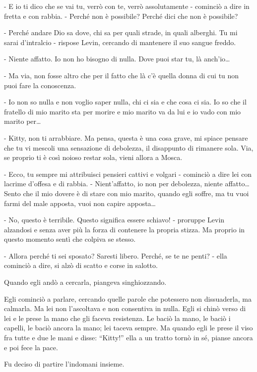 - E io ti dico che se vai tu, verrò con te, verrò assolutamente - cominciò a dire in fretta e con rabbia. - Perché non è possibile? Perché dici che non è possibile? 

- Perché andare Dio sa dove, chi sa per quali strade, in quali alberghi. Tu mi sarai d'intralcio - rispose Levin, cercando di mantenere il suo sangue freddo. 

- Niente affatto. Io non ho bisogno di nulla. Dove puoi star tu, là anch'io\ldots{} 

- Ma via, non fosse altro che per il fatto che là c'è quella donna di cui tu non puoi fare la conoscenza. 

- Io non so nulla e non voglio saper nulla, chi ci sia e che cosa ci sia. Io so che il fratello di mio marito sta per morire e mio marito va da lui e io vado con mio marito per\ldots{} 

- Kitty, non ti arrabbiare. Ma pensa, questa è una cosa grave, mi spiace pensare che tu vi mescoli una sensazione di debolezza, il disappunto di rimanere sola. Via, se proprio ti è così noioso restar sola, vieni allora a Mosca. 

- Ecco, tu sempre mi attribuisci pensieri cattivi e volgari - cominciò a dire lei con lacrime d'offesa e di rabbia. - Nient'affatto, io non per debolezza, niente affatto\ldots{} Sento che il mio dovere è di stare con mio marito, quando egli soffre, ma tu vuoi farmi del male apposta, vuoi non capire apposta\ldots{} 

- No, questo è terribile. Questo significa essere schiavo! - proruppe Levin alzandosi e senza aver più la forza di contenere la propria stizza. Ma proprio in questo momento sentì che colpiva se stesso. 

- Allora perché ti sei sposato? Saresti libero. Perché, se te ne penti? - ella cominciò a dire, si alzò di scatto e corse in salotto. 

Quando egli andò a cercarla, piangeva singhiozzando. 

Egli cominciò a parlare, cercando quelle parole che potessero non dissuaderla, ma calmarla. Ma lei non l'ascoltava e non consentiva in nulla. Egli si chinò verso di lei e le prese la mano che gli faceva resistenza. Le baciò la mano, le baciò i capelli, le baciò ancora la mano; lei taceva sempre. Ma quando egli le prese il viso fra tutte e due le mani e disse: ``Kitty!'' ella a un tratto tornò in sé, pianse ancora e poi fece la pace. 

Fu deciso di partire l'indomani insieme. 

